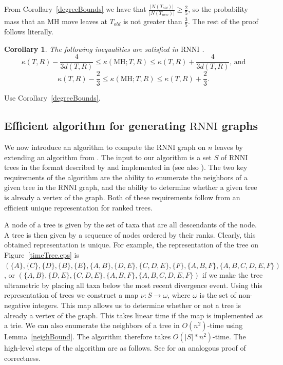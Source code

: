 \documentclass[11pt]{amsart}
\newtheorem{corollary}[lemma]{Corollary}
\theoremstyle{definition}
\newcommand{\rnni}{\mathrm{RNNI}}
\newcommand{\MH}{\mathrm{MH}}
\begin{document}
{\proof
From Corollary~\ref{degreeBounds} we have that $\frac{|N(T_{old})|}{|N(T_{new})|} \geq \frac{2}{5}$, so the probability mass that an MH move leaves at $T_{old}$ is not greater than $\frac35$.
The rest of the proof follows \autocite[][Proof of Lemma~V.8]{Whidden2015-es} literally.
\endproof

\begin{corollary}
The following inequalities are satisfied in $\rnni$ .
\[
\kappa(T,R) - \dfrac{4}{3d(T,R)} \leq \kappa(\MH;T,R) \leq \kappa(T,R) +
\dfrac{4}{3d(T,R)}\mbox{, and}
\]
\[
\kappa(T,R) - \dfrac23 \leq \kappa(\MH;T,R) \leq \kappa(T,R) + \dfrac23.
\]
\end{corollary}

\proof
Use Corollary~\ref{degreeBounds}.
\endproof
}{}


\subsection{Efficient algorithm for generating $\rnni$ graphs}

We now introduce an algorithm to compute the $\rnni$ graph on $n$ leaves by extending an algorithm from \textcite{Whidden2015-es}.
The input to our algorithm is a set $S$ of $\rnni$ trees in the format described by \textcite{Gavryushkin2014-bw} and implemented in \autocite{tauGeodesic} (see also \autocite{Semple2003-nj}).
The two key requirements of the algorithm are the ability to enumerate the neighbors of a given tree in the $\rnni$ graph, and the ability to determine whether a given tree is already a vertex of the graph.
Both of these requirements follow from an efficient unique representation for ranked trees.

A node of a tree is given by the set of taxa that are all descendants of the node.
A tree is then given by a sequence of nodes ordered by their ranks.
Clearly, this obtained representation is unique.
For example, the representation of the tree on Figure~\ref{timeTree.eps} is $(\{A\}, \{C\}, \{D\}, \{B\}, \{E\}, \{A,B\}, \{D,E\}, \{C, D, E\}, \{F\}, \{A,B,F\}, \{A,B,C,D,E,F\})$, or
$(\{A,B\}, \{D,E\}, \{C, D, E\}, \{A,B,F\}, \{A,B,C,D,E,F\})$ if we make the tree ultrametric by placing all taxa below the most recent divergence event.
Using this representation of trees we construct a map $\nu : S \to \omega$, where $\omega$ is the set of non-negative integers.
This map allows us to determine whether or not a tree is already a vertex of the graph.
This takes linear time if the map is implemented as a trie.
We can also enumerate the neighbors of a tree in $O(n^2)$-time using Lemma~\ref{neighBound}.
The algorithm therefore takes $O(|S|*n^2)$-time.
The high-level steps of the algorithm are as follows.
See \cite{Whidden2015-es} for an analogous proof of correctness.
\end{document}
